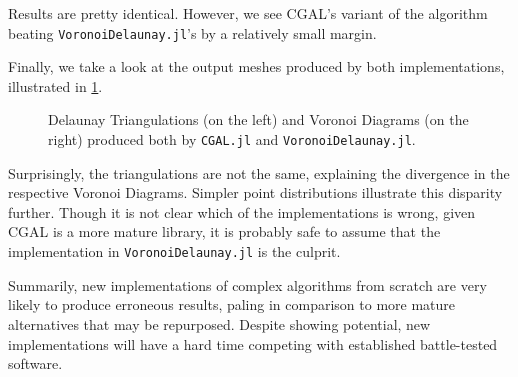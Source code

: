 Results are pretty identical.  However, we see \ac{CGAL}'s variant of the
algorithm beating \texttt{VoronoiDelaunay.jl}'s by a relatively small margin.

Finally, we take a look at the output meshes produced by both implementations,
illustrated in \cref{fig:eval.voronoi.output}.

\begin{figure}[htb]
  \resizebox{\linewidth}{!}{}
  \caption{\label{fig:eval.voronoi.output}
    Delaunay Triangulations (on the left) and Voronoi Diagrams (on the right)
    produced both by \texttt{CGAL.jl} and \texttt{VoronoiDelaunay.jl}.}%
\end{figure}

Surprisingly, the triangulations are not the same, explaining the divergence in
the respective Voronoi Diagrams.  Simpler point distributions illustrate this
disparity further.  Though it is not clear which of the implementations is
wrong, given \ac{CGAL} is a more mature library, it is probably safe to assume
that the implementation in \texttt{VoronoiDelaunay.jl} is the culprit.

Summarily, new implementations of complex algorithms from scratch are very
likely to produce erroneous results, paling in comparison to more mature
alternatives that may be repurposed.  Despite showing potential, new
implementations will have a hard time competing with established battle-tested
software.

